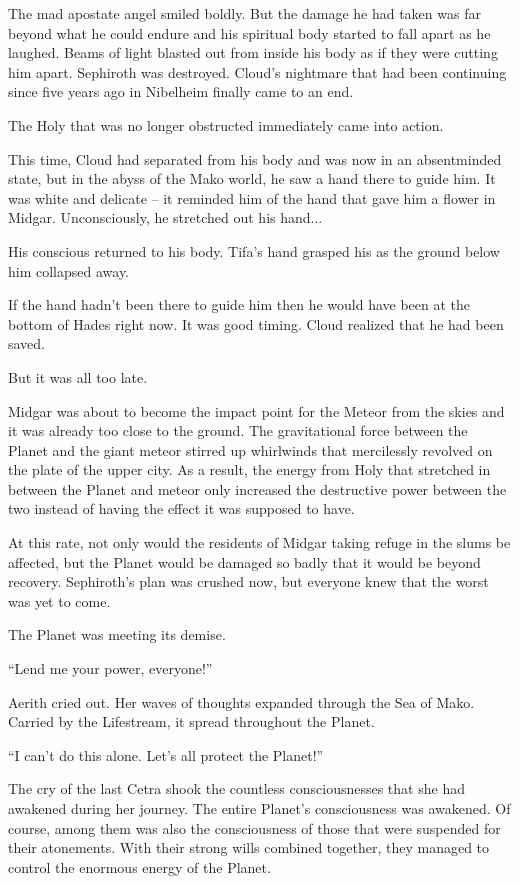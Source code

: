 \documentclass[oneside]{book}
\begin{document}
The mad apostate angel smiled boldly. But the damage he had taken was far beyond what he could endure and his spiritual body started to fall apart as he laughed. Beams of light blasted out from inside his body as if they were cutting him apart. Sephiroth was destroyed. Cloud's nightmare that had been continuing since five years ago in Nibelheim finally came to an end.

The Holy that was no longer obstructed immediately came into action.

This time, Cloud had separated from his body and was now in an absentminded state, but in the abyss of the Mako world, he saw a hand there to guide him. It was white and delicate – it reminded him of the hand that gave him a flower in Midgar. Unconsciously, he stretched out his hand...

His conscious returned to his body. Tifa's hand grasped his as the ground below him collapsed away.

If the hand hadn't been there to guide him then he would have been at the bottom of Hades right now. It was good timing. Cloud realized that he had been saved.

But it was all too late.

Midgar was about to become the impact point for the Meteor from the skies and it was already too close to the ground. The gravitational force between the Planet and the giant meteor stirred up whirlwinds that mercilessly revolved on the plate of the upper city. As a result, the energy from Holy that stretched in between the Planet and meteor only increased the destructive power between the two instead of having the effect it was supposed to have.

At this rate, not only would the residents of Midgar taking refuge in the slums be affected, but the Planet would be damaged so badly that it would be beyond recovery. Sephiroth's plan was crushed now, but everyone knew that the worst was yet to come.

The Planet was meeting its demise.

“Lend me your power, everyone!”

Aerith cried out. Her waves of thoughts expanded through the Sea of Mako. Carried by the Lifestream, it spread throughout the Planet.

“I can't do this alone. Let's all protect the Planet!”

The cry of the last Cetra shook the countless consciousnesses that she had awakened during her journey. The entire Planet's consciousness was awakened. Of course, among them was also the consciousness of those that were suspended for their atonements. With their strong wills combined together, they managed to control the enormous energy of the Planet.
\end{document}
